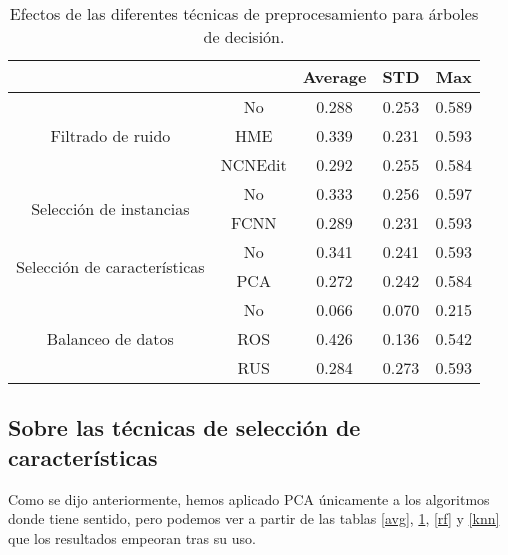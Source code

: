 \begin{table}
    \centering
    \begin{tabular}{cc|c|c|c|}
    \cline{3-5}
    \multicolumn{1}{l}{\textbf{}} & \textbf{} & \multicolumn{1}{c|}{\textbf{Average}} & \multicolumn{1}{c|}{\textbf{STD}} & \textbf{Max} \\ \hline
    \multicolumn{1}{|c|}{\multirow{3}{*}{Filtrado de ruido}}       & No        & 0.288 & 0.253
    & 0.589    \\ \cline{2-5} 
    \multicolumn{1}{|c|}{}  & HME       & 0.339 &  0.231
    & 0.593        \\ \cline{2-5} 
    \multicolumn{1}{|c|}{}  & NCNEdit   & 0.292 &  0.255
    & 0.584        \\ \hline
    \multicolumn{1}{|c|}{\multirow{2}{*}{Selección de instancias}} & No        & 0.333  & 0.256
    & 0.597        \\ \cline{2-5} 
    \multicolumn{1}{|c|}{}  & FCNN      & 0.289 &  0.231
    & 0.593        \\ \hline
    \multicolumn{1}{|c|}{\multirow{2}{*}{Selección de características}} & No        & 0.341  &  0.241
    & 0.593        \\ \cline{2-5} 
    \multicolumn{1}{|c|}{}  & PCA      & 0.272  & 0.242
    & 0.584        \\ \hline
    \multicolumn{1}{|c|}{\multirow{3}{*}{Balanceo de datos}}       & No        & 0.066  &  0.070
    & 0.215        \\ \cline{2-5} 
    \multicolumn{1}{|c|}{}  & ROS       & 0.426 &  0.136
    & 0.542        \\ \cline{2-5} 
    \multicolumn{1}{|c|}{}  & RUS       & 0.284 &  0.273
    & 0.593        \\ \hline
    \end{tabular}
    \caption{Efectos de las diferentes técnicas de preprocesamiento para árboles de decisión.}
    \label{dt}
\end{table}

\subsection{Sobre las técnicas de selección de características}

Como se dijo anteriormente, hemos aplicado PCA únicamente a los algoritmos donde tiene sentido, pero podemos ver a partir de las tablas \ref{avg}, \ref{dt}, \ref{rf} y \ref{knn} que los resultados empeoran tras su uso.

\vspace{\baselineskip}

